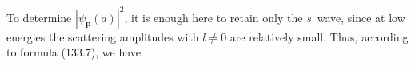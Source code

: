 To determine $|\psi_{\mathbf p}(a)|^2$, it is enough here to retain only the $s$~wave, since at low energies the scattering amplitudes with $l\ne0$ are relatively small. Thus, according to formula (133.7), we have
